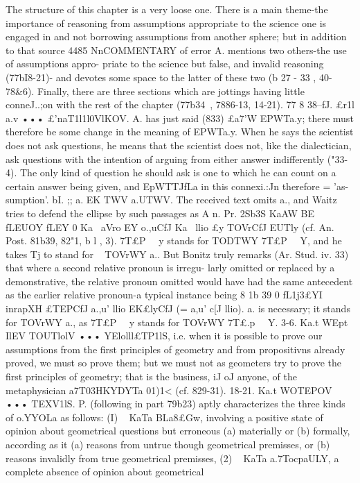 {{{{{{{{{{{{The structure of this chapter is a very loose one. There is a
main theme-the importance of reasoning from assumptions
appropriate to the science one is engaged in and not borrowing
assumptions from another sphere; but in addition to that source
4485
NnCOMMENTARY
of error A. mentions two others-the use of assumptions appro-
priate to the science but false, and invalid reasoning (77bI8-21)-
and devotes some space to the latter of these two (b 27 - 33 , 40-
78&6). Finally, there are three sections which are jottings having
little conneJ..;on with the rest of the chapter (77b34~, 7886-13,
14-21).
77 8 38--fJ. £r1l a.v ••• £'naT1l1l0VlKOV. A. has just said (833)
£a7'W EPWTa.y; there must therefore be some
change in the meaning of EPWTa.y. When he says the scientist
does not ask questions, he means that the scientist does not, like
the dialectician, ask questions with the intention of arguing from
either answer indifferently ("33-4). The only kind of question
he should ask is one to which he can count on a certain answer
being given, and EpWTTJfLa in this connexi.:Jn therefore = 'as-
sumption'.
bI. ;; a. EK TWV a.UTWV. The received text omits a., and Waitz
tries to defend the ellipse by such passages as A n. Pr. 2Sb3S
KaAW BE fLEUOY fLEY 0 Ka~ aVro EY o.,uCfJ Ka~ llio £y TOVrCfJ EUTly (cf.
An. Post. 81b39, 82"1, b l , 3). 7T£P~ ~y stands for TODTWY 7T£P~ ~Y,
and he takes Tj to stand for ~ TOVrWY a.. But Bonitz truly remarks
(Ar. Stud. iv. 33) that where a second relative pronoun is irregu-
larly omitted or replaced by a demonstrative, the relative pronoun
omitted would have had the same antecedent as the earlier
relative pronoun-a typical instance being 8 1b 39 0 fL1j3£YI inrapXH
£TEPCfJ a.,u' llio EK£lyCfJ (= a,u' c[J llio). a. is necessary; it stands
for TOVrWY a., as 7T£P~ ~y stands for TOVrWY 7T£.p~ ~Y.
3-6. Ka.t WEpt IlEV TOUTlolV ••• YElolll£TP1lS, i.e. when it is possible
to prove our assumptions from the first principles of geometry and
from propositivns already proved, we must so prove them; but
we must not as geometers try to prove the first principles of
geometry; that is the business, iJ oJ anyone, of the metaphysician
a7T03HKYDYTa 01)1<
(cf. 829-31).
18-21. Ka.t WOTEPOV ••• TEXV1lS. P. (following in part 79b23)
aptly characterizes the three kinds of o.YYOLa as follows: (I) ~ KaTa
BLa8£Gw, involving a positive state of opinion about geometrical
questions but erroneous (a) materially or (b) formally, according
as it (a) reasons from untrue though geometrical premisses, or
(b) reasons invalidly from true geometrical premisses, (2) ~ KaTa
a.7TocpaULY, a complete absence of opinion about geometrical
}}}}}}}}}}}}
